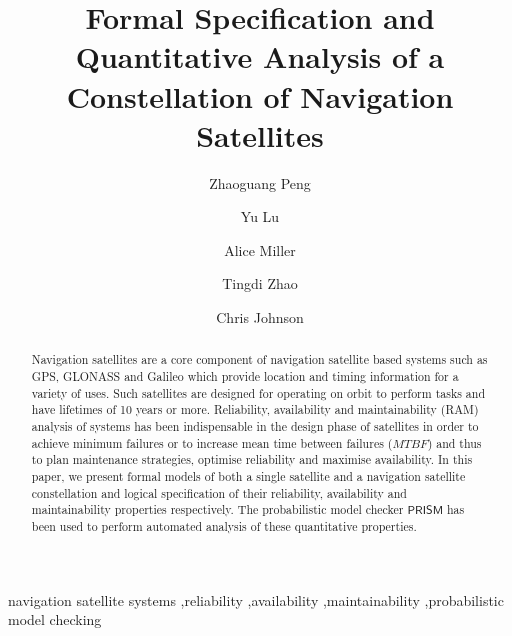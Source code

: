 \documentclass[preprint,12pt]{qrei}
\begin{document}
\begin{frontmatter}





\title{Formal Specification and Quantitative Analysis of a Constellation of Navigation Satellites}

\author[label1,label3]{Zhaoguang Peng}
  \address[label1]{China Ceprei Laboratory, Guangzhou, China}
  \address[label2]{School of Computing Science, University of Glasgow, Glasgow, UK}
 \address[label3]{School of Reliability and Systems Engineering, Beijing University of Aeronautics and Astronautics, Beijing, China}
  \author[label2]{Yu Lu}
  \author[label2]{Alice Miller}
  \author[label3]{Tingdi Zhao}
  \author[label2]{Chris Johnson}






\begin{abstract}
Navigation satellites are a core component of navigation satellite based systems such as GPS, GLONASS and Galileo which provide location and timing information for a variety of uses. Such satellites are designed for operating on orbit to perform tasks and have lifetimes of 10 years or more. Reliability, availability and maintainability (RAM) analysis of systems has been indispensable in the design phase of satellites in order to achieve minimum failures or to increase mean time between failures ($MTBF$) and thus to plan maintenance strategies, optimise reliability and maximise availability. In this paper, we present formal models of both a single satellite and a navigation satellite constellation and logical specification of their reliability, availability and maintainability properties respectively. The probabilistic model checker $\mathsf{PRISM}$ has been used to perform automated analysis of these quantitative properties.
\end{abstract}

\begin{keyword}


navigation satellite systems \sep reliability \sep availability \sep maintainability \sep probabilistic model checking



\end{keyword}

\end{frontmatter}
\end{document}
